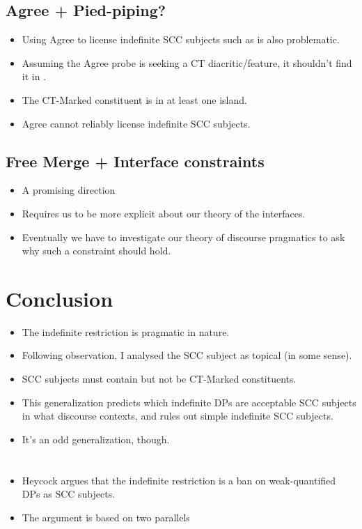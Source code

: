 \documentclass[letterpaper]{article}
\begin{document}
\subsection{Agree + Pied-piping?}
\begin{itemize}
  \item Using Agree to license indefinite SCC subjects such as \LLast is also problematic.
  \item Assuming the Agree probe is seeking a CT diacritic/feature, it shouldn't find it in \LLast.
  \item The CT-Marked constituent is in at least one island.
  \item Agree cannot reliably license indefinite SCC subjects.
\end{itemize}
\subsection{Free Merge + Interface constraints}
\begin{itemize}
  \item A promising direction
  \item Requires us to be more explicit about our theory of the interfaces.
  \item Eventually we have to investigate our theory of discourse pragmatics to ask why such a constraint should hold.
\end{itemize}
\section{Conclusion}
\begin{itemize}
  \item The indefinite restriction is pragmatic in nature.
  \item Following  observation, I analysed the SCC subject as topical (in some sense).
  \item SCC subjects must contain but not be CT-Marked constituents.
  \item This generalization predicts which indefinite DPs are acceptable SCC subjects in what discourse contexts, and rules out simple indefinite SCC subjects.
  \item It's an odd generalization, though.
\end{itemize}
\printbibliography
\appendix
\section{\textcite{heycock2012specification}}\label{sec:Heycock}
\begin{itemize}
  \item Heycock argues that the indefinite restriction is a ban on weak-quantified DPs as SCC subjects.
  \item The argument is based on two parallels 
\end{itemize}
\end{document}
